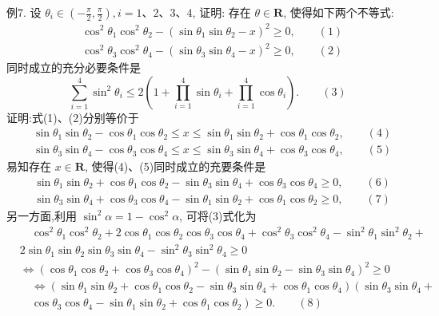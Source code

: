 例7. 设 $\theta_i \in\left(-\frac{\pi}{2}, \frac{\pi}{2}\right), i=1 、 2 、 3 、 4$, 证明: 存在 $\theta \in \mathbf{R}$, 使得如下两个不等式:
$$
\begin{aligned}
& \cos ^2 \theta_1 \cos ^2 \theta_2-\left(\sin \theta_1 \sin \theta_2-x\right)^2 \geqslant 0, \quad\quad(1)\\
& \cos ^2 \theta_3 \cos ^2 \theta_4-\left(\sin \theta_3 \sin \theta_4-x\right)^2 \geqslant 0, \quad\quad(2)
\end{aligned}
$$
同时成立的充分必要条件是
$$
\sum_{i=1}^4 \sin ^2 \theta_i \leqslant 2\left(1+\prod_{i=1}^4 \sin \theta_i+\prod_{i=1}^4 \cos \theta_i\right) .\quad\quad(3)
$$
证明:式(1)、(2)分别等价于
$$
\begin{aligned}
& \sin \theta_1 \sin \theta_2-\cos \theta_1 \cos \theta_2 \leqslant x \leqslant \sin \theta_1 \sin \theta_2+\cos \theta_1 \cos \theta_2,\quad\quad(4)\\
& \sin \theta_3 \sin \theta_4-\cos \theta_3 \cos \theta_4 \leqslant x \leqslant \sin \theta_3 \sin \theta_4+\cos \theta_3 \cos \theta_4,\quad\quad(5)
\end{aligned}
$$
易知存在 $x \in \mathbf{R}$, 使得(4)、(5)同时成立的充要条件是
$$
\begin{aligned}
& \sin \theta_1 \sin \theta_2+\cos \theta_1 \cos \theta_2-\sin \theta_3 \sin \theta_4+\cos \theta_3 \cos \theta_4 \geqslant 0, \quad\quad(6)\\
& \sin \theta_3 \sin \theta_4+\cos \theta_3 \cos \theta_4-\sin \theta_1 \sin \theta_2+\cos \theta_1 \cos \theta_2 \geqslant 0, \quad\quad(7)
\end{aligned}
$$
另一方面,利用 $\sin ^2 \alpha=1-\cos ^2 \alpha$, 可将(3)式化为
$$
\begin{aligned}
& \quad \cos ^2 \theta_1 \cos ^2 \theta_2+2 \cos \theta_1 \cos \theta_2 \cos \theta_3 \cos \theta_4+\cos ^2 \theta_3 \cos ^2 \theta_4-\sin ^2 \theta_1 \sin ^2 \theta_2+ \\
& 2 \sin \theta_1 \sin \theta_2 \sin \theta_3 \sin \theta_4-\sin ^2 \theta_3 \sin ^2 \theta_4 \geqslant 0 \\
& \Leftrightarrow\left(\cos \theta_1 \cos \theta_2+\cos \theta_3 \cos \theta_4\right)^2-\left(\sin \theta_1 \sin \theta_2-\sin \theta_3 \sin \theta_4\right)^2 \geqslant 0 \\
& \quad \Leftrightarrow\left(\sin \theta_1 \sin \theta_2+\cos \theta_1 \cos \theta_2-\sin \theta_3 \sin \theta_4+\cos \theta_1 \cos \theta_4\right)\left(\sin \theta_3 \sin \theta_4+\right. \\
& \left.\quad \cos \theta_3 \cos \theta_4-\sin \theta_1 \sin \theta_2+\cos \theta_1 \cos \theta_2\right) \geqslant 0. \quad\quad(8)
\end{aligned}
$$
